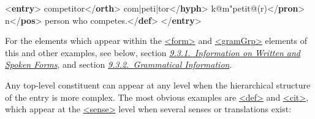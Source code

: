  \par\bgroup{}\exampleFont \begin{shaded}\noindent\mbox{}{<\textbf{entry}>}\mbox{}\newline 
{}\mbox{}\newline 
\hspace*{1em}competitor{</\textbf{orth}>}\mbox{}\newline 
\hspace*{1em}com|peti|tor{</\textbf{hyph}>}\mbox{}\newline 
\hspace*{1em}k@m"petit@(r){</\textbf{pron}>}\mbox{}\newline 
{}\mbox{}\newline 
{}\mbox{}\newline 
\hspace*{1em}n{</\textbf{pos}>}\mbox{}\newline 
{}\mbox{}\newline 
{}person who competes.{</\textbf{def}>}\mbox{}\newline 
{</\textbf{entry}>}\end{shaded}\egroup\par \noindent  For the elements which appear within the \hyperref[TEI.form]{<form>} and \hyperref[TEI.gramGrp]{<gramGrp>} elements of this and other examples, see below, section \textit{\hyperref[DITPFO]{9.3.1.\ Information on Written and Spoken Forms}}, and section \textit{\hyperref[DITPGR]{9.3.2.\ Grammatical Information}}.\par
Any top-level constituent can appear at any level when the hierarchical structure of the entry is more complex. The most obvious examples are \hyperref[TEI.def]{<def>} and \hyperref[TEI.cit]{<cit>}, which appear at the \hyperref[TEI.sense]{<sense>} level when several senses or translations exist:
